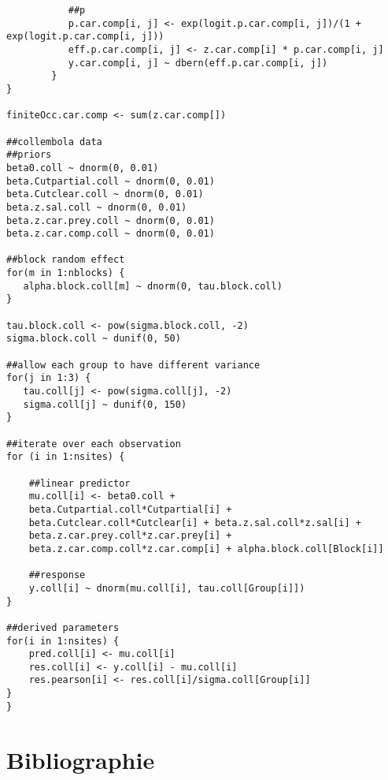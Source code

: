 \begin{lstlisting}
      	   ##p
      	   p.car.comp[i, j] <- exp(logit.p.car.comp[i, j])/(1 + exp(logit.p.car.comp[i, j]))
      	   eff.p.car.comp[i, j] <- z.car.comp[i] * p.car.comp[i, j]
      	   y.car.comp[i, j] ~ dbern(eff.p.car.comp[i, j])
      	}
}

finiteOcc.car.comp <- sum(z.car.comp[])

##collembola data
##priors
beta0.coll ~ dnorm(0, 0.01)
beta.Cutpartial.coll ~ dnorm(0, 0.01)
beta.Cutclear.coll ~ dnorm(0, 0.01)
beta.z.sal.coll ~ dnorm(0, 0.01)
beta.z.car.prey.coll ~ dnorm(0, 0.01)
beta.z.car.comp.coll ~ dnorm(0, 0.01)

##block random effect
for(m in 1:nblocks) {
   alpha.block.coll[m] ~ dnorm(0, tau.block.coll)
}

tau.block.coll <- pow(sigma.block.coll, -2)
sigma.block.coll ~ dunif(0, 50)

##allow each group to have different variance
for(j in 1:3) {
   tau.coll[j] <- pow(sigma.coll[j], -2)
   sigma.coll[j] ~ dunif(0, 150)
}

##iterate over each observation
for (i in 1:nsites) {

    ##linear predictor  
    mu.coll[i] <- beta0.coll +
    beta.Cutpartial.coll*Cutpartial[i] +
    beta.Cutclear.coll*Cutclear[i] + beta.z.sal.coll*z.sal[i] +
    beta.z.car.prey.coll*z.car.prey[i] +
    beta.z.car.comp.coll*z.car.comp[i] + alpha.block.coll[Block[i]]

    ##response
    y.coll[i] ~ dnorm(mu.coll[i], tau.coll[Group[i]])
}

##derived parameters
for(i in 1:nsites) {
    pred.coll[i] <- mu.coll[i]
    res.coll[i] <- y.coll[i] - mu.coll[i]
    res.pearson[i] <- res.coll[i]/sigma.coll[Group[i]]
}
}
\end{lstlisting}
\clearpage

\chapter*{Bibliographie}         
\label{chap:biblio}         

\nocite{*}
\renewcommand{\bibsection}{}
\begin{otherlanguage}{english}


\end{otherlanguage}
